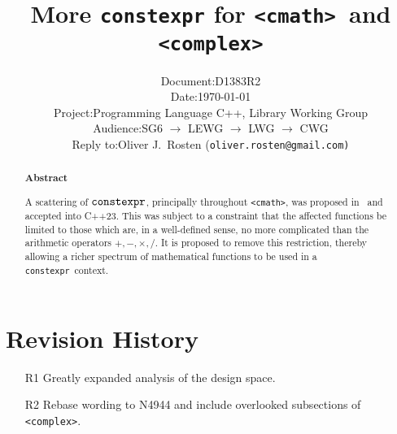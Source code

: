 \documentclass[prd,twocolumn,amsmath,amssymb,nofootinbib,eqsecnum]{revtex4-1}
\newcommand{\constexpr}{\code{constexpr}\xspace}
\newcommand{\code}[1]{{\tt #1}}
\newcommand{\header}[1]{{\tt <#1>}}
\newcommand{\cmath}{\header{cmath}}
\newcommand{\complex}{\header{complex}}
\newcommand{\Operators}{\ensuremath{+,-,\times,/}}
\begin{document}
\title{More \constexpr for \cmath\ and \complex}

\author{
\begin{tabular}{ll}
	Document: & D1383R2
\\
	Date: & \today
\\
	Project: & Programming Language C++, Library Working Group
\\
	Audience: & SG6 $\rightarrow$ LEWG $\rightarrow$ LWG $\rightarrow$ CWG
\\
	Reply to: & Oliver J.\ Rosten {(\tt oliver.rosten@gmail.com)}
\end{tabular}
}

\begin{abstract}

\begin{center} {\bf Abstract} \end{center}

A scattering of $\constexpr$, principally throughout \cmath, was proposed in~\cite{Rosten-constexpr} and accepted into C++23. This was subject to a constraint that the affected functions be limited to those which are, in a well-defined sense, no more complicated than the arithmetic operators \Operators. It is proposed to remove this restriction, thereby allowing a richer spectrum of mathematical functions to be used in a \constexpr\ context. 


\end{abstract}


\maketitle
\tableofcontents

\section{Revision History}

\begin{enumerate}
	\item[R1] Greatly expanded analysis of the design space.
	
	\item[R2] Rebase wording to N4944 and include overlooked subsections of \complex.
\end{enumerate}
\end{document}
